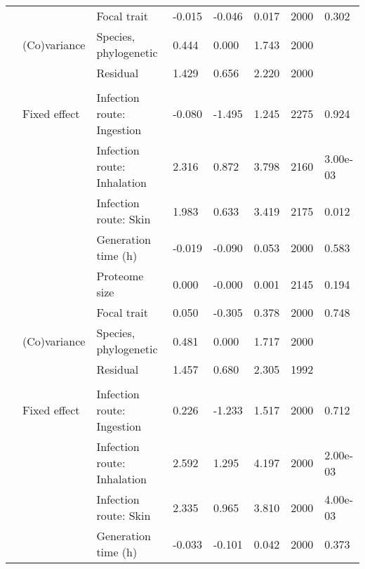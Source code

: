 \begin{table}
\begin{tabular}[t]{llllllll}
\hspace{1em} &  & Focal trait & -0.015 & -0.046 & 0.017 & 2000 & 0.302\\
\hspace{1em} & (Co)variance & Species, phylogenetic & 0.444 & 0.000 & 1.743 & 2000 & \\
\hspace{1em} &  & Residual & 1.429 & 0.656 & 2.220 & 2000 & \\
\addlinespace[0.3em]
\multicolumn{8}{l}{\textbf{Biofilm}}\\
\hspace{1em} & Fixed effect & Infection route: Ingestion & -0.080 & -1.495 & 1.245 & 2275 & 0.924\\
\hspace{1em} &  & Infection route: Inhalation & 2.316 & 0.872 & 3.798 & 2160 & 3.00e-03\\
\hspace{1em} &  & Infection route: Skin & 1.983 & 0.633 & 3.419 & 2175 & 0.012\\
\hspace{1em} &  & Generation time (h) & -0.019 & -0.090 & 0.053 & 2000 & 0.583\\
\hspace{1em} &  & Proteome size & 0.000 & -0.000 & 0.001 & 2145 & 0.194\\
\hspace{1em} &  & Focal trait & 0.050 & -0.305 & 0.378 & 2000 & 0.748\\
\hspace{1em} & (Co)variance & Species, phylogenetic & 0.481 & 0.000 & 1.717 & 2000 & \\
\hspace{1em} &  & Residual & 1.457 & 0.680 & 2.305 & 1992 & \\
\addlinespace[0.3em]
\multicolumn{8}{l}{\textbf{Siderophores}}\\
\hspace{1em} & Fixed effect & Infection route: Ingestion & 0.226 & -1.233 & 1.517 & 2000 & 0.712\\
\hspace{1em} &  & Infection route: Inhalation & 2.592 & 1.295 & 4.197 & 2000 & 2.00e-03\\
\hspace{1em} &  & Infection route: Skin & 2.335 & 0.965 & 3.810 & 2000 & 4.00e-03\\
\hspace{1em} &  & Generation time (h) & -0.033 & -0.101 & 0.042 & 2000 & 0.373\\

\end{tabular}
\end{table}
